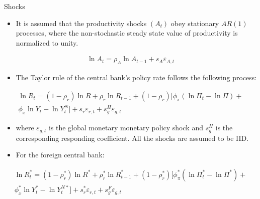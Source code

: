 \documentclass[10pt]{beamer}
\begin{document}
\begin{frame}{Shocks}

\begin{itemize}
    \item It is assumed that the productivity shocks $\left(A_{t}\right)$ obey stationary $A R(1)$ processes, where the non-stochastic steady state value of productivity is normalized to unity.
\end{itemize}
$$
\begin{gathered}
\ln A_{t}=\rho_{A} \ln A_{t-1}+s_{A} \varepsilon_{A, t}
\end{gathered}
$$

\begin{itemize}
    \item The Taylor rule of the central bank's policy rate follows the following process:
\end{itemize}
\begin{gather*}
\ln R_{t}=\left(1-\rho_{r}\right) \ln R +\rho_{r}\ln R_{t-1} + \left(1-\rho_{r}\right) [ \phi_{\pi}\left(\ln \Pi_{t}-\ln \Pi\right)+ \\ 
\phi_{x}\ln Y_{t}-\ln Y_{t}^{N} ] +s_{r}\varepsilon_{r,t}+s_{g}^{H}\varepsilon_{g, t}
\end{gather*}

\begin{itemize}
    \item where $\varepsilon_{g, t}$  is the global monetary monetary policy shock and $s_{g}^{H}$ is the corresponding responding coefficient. All the shocks are assumed to be IID.
\end{itemize}

\begin{itemize}
    \item For the foreign central bank:
\end{itemize}
\begin{gather*}
\ln R_{t}^{*}=\left(1-\rho_{r}^{*}\right) \ln R^{*}+ \rho_{r}^{*}\ln R_{t-1}^{*} + \left(1-\rho_{r}^{*}\right)[\phi_{\pi}^{*}\left(\ln \Pi_{t}^{*}-\ln \Pi^{*}\right)+ \\ \phi_{x}^{*}\ln Y_{t}^{*}-\ln Y_{t}^{N*}] 
 +s_{r}^{*}\varepsilon_{r, t}+s_{g}^{F}\varepsilon_{g, t}
\end{gather*}

\end{frame}
\end{document}
